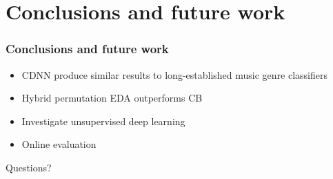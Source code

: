 \documentclass{beamer}
\begin{document}




\section{Conclusions and future work}
\begin{frame}
\frametitle{Conclusions and future work}
\begin{itemize}
\item CDNN produce similar results to long-established music genre classifiers
\item Hybrid permutation EDA outperforms CB
\item Investigate unsupervised deep learning
\item Online evaluation
\end{itemize}
\end{frame}




\begin{frame}
\Huge{\centerline{Questions?}}
\end{frame}

\end{document}
